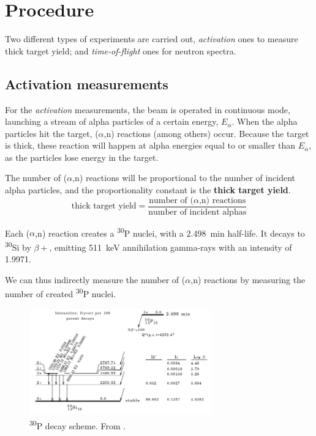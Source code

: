 \documentclass[a4paper,12pt]{report}
\newcommand{\an}{($\alpha$,n) }
\newcommand{\Piso}{\textsuperscript{30}P }
\begin{document}
\section{Procedure}
Two different types of experiments are carried out, \textit{activation} ones to measure thick target yield; and \textit{time-of-flight} ones for neutron spectra.

\subsection{Activation measurements}
For the \textit{activation} measurements, the beam is operated in continuous mode, launching a stream of alpha particles of a certain energy, $E_\alpha$.
When the alpha particles hit the target, \an reactions (among others) occur.
Because the target is thick, these reaction will happen at alpha energies equal to or smaller than $E_\alpha$, as the particles lose energy in the target.

The number of \an reactions will be proportional to the number of incident alpha particles, and the proportionality constant is the \textbf{thick target yield}.
\begin{equation}
	\text{thick target yield} = \frac{\text{number of \an reactions}}{\text{number of incident alphas}}
\end{equation}

Each \an reaction creates a \Piso nuclei, with a \qty{2.498}{\minute} half-life.
It decays to \textsuperscript{30}Si by $\beta +$, emitting \qty{511}{\keV} annihilation gamma-rays with an intensity of \num{1.9971}.\cite{nucleardatasheets}

We can thus indirectly measure the number of \an reactions by measuring the number of created \Piso nuclei.
\\

\begin{figure}[H]
	\centering
	\includegraphics[width=0.7\textwidth]{Piso_decay_scheme.png}
	\caption{\Piso decay scheme.
	From \cite{nucleardatasheets}.}
	\label{Piso_decay_scheme}
\end{figure}
\end{document}
